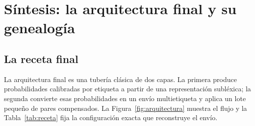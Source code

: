 \section{Síntesis: la arquitectura final y su genealogía}
\label{sec:arquitectura}

\subsection{La receta final}

La arquitectura final es una tubería clásica de dos capas. La primera produce
probabilidades calibradas por etiqueta a partir de una representación
subléxica; la segunda convierte esas probabilidades en un envío multietiqueta
y aplica un lote pequeño de pares compensados. La
Figura~\ref{fig:arquitectura} muestra el flujo y la
Tabla~\ref{tab:receta} fija la configuración exacta que reconstruye el envío.

